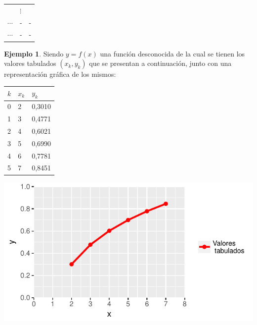 \documentclass[openany]{book}
\begin{document}
\begin{longtable}[]{@{}lll@{}}
\begin{minipage}[t]{0.43\columnwidth}
\end{minipage} & \begin{minipage}[t]{0.41\columnwidth}\raggedright
\(\vdots\)\strut
\end{minipage}\tabularnewline
\begin{minipage}[t]{0.07\columnwidth}\raggedright
\(\cdots\)\strut
\end{minipage} & \begin{minipage}[t]{0.43\columnwidth}\raggedright
-\strut
\end{minipage} & \begin{minipage}[t]{0.41\columnwidth}\raggedright
-\strut
\end{minipage}\tabularnewline
\begin{minipage}[t]{0.07\columnwidth}\raggedright
\(\cdots\)\strut
\end{minipage} & \begin{minipage}[t]{0.43\columnwidth}\raggedright
-\strut
\end{minipage} & \begin{minipage}[t]{0.41\columnwidth}\raggedright
-\strut
\end{minipage}\tabularnewline
\bottomrule
\end{longtable}

\textbf{Ejemplo 1}. Siendo \(y=f(x)\) una función desconocida de la cual se tienen los valores tabulados \((x_k, y_k)\) que se presentan a continuación, junto con una representación gráfica de los mismos:

\begin{longtable}[]{@{}lll@{}}
\toprule
\(k\) & \(x_k\) & \(y_k\)\tabularnewline
\midrule
\endhead
0 & 2 & 0,3010\tabularnewline
1 & 3 & 0,4771\tabularnewline
2 & 4 & 0,6021\tabularnewline
3 & 5 & 0,6990\tabularnewline
4 & 6 & 0,7781\tabularnewline
5 & 7 & 0,8451\tabularnewline
\bottomrule
\end{longtable}

\begin{center}\includegraphics[width=1\linewidth]{Plots/U4/Unidad4_g1} \end{center}
\end{document}
